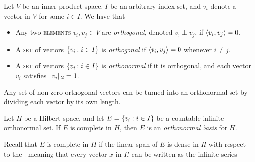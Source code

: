 \documentclass[../thesis.tex]{subfiles}
\begin{document}
\begin{definition}
    Let $V$ be an inner product space, $I$ be an arbitrary index set, and $v_i$ denote a vector in $V$ for some $i\in I$. We have that
    \begin{itemize}%
        \item Any two \textsc{elements} $v_i, v_j \in V$ are \emph{orthogonal}, denoted $v_i \perp v_j$, if $\langle v_i,v_j\rangle = 0$.
        \item A \textsc{set} of vectors $\{v_i : i \in I\}$ is \emph{orthogonal} if $\langle v_i,v_j\rangle = 0$ whenever $i\neq j$. %
        \item A \textsc{set} of vectors $\{v_i : i \in I\}$ is \emph{orthonormal} if it is orthogonal, and each vector $v_i$ satisfies $\|v_i\|_2 = 1$. %
        \qedhere
    \end{itemize}
\end{definition}
\begin{remark}
    Any set of non-zero orthogonal vectors can be turned into an orthonormal set by dividing each vector by its own length.
\end{remark}
\begin{definition}
    Let $H$ be a Hilbert space, and let $E = \{v_i : i \in I\}$ be a countable infinite orthonormal set. If $E$ is complete in $H$, then $E$ is an \emph{orthonormal basis} for $H$.
\end{definition}
Recall that $E$ is complete in $H$ if the linear span of $E$ is dense in $H$ with respect to the \GenNormH, meaning that every vector $x$ in $H$ can be written as the infinite series
\end{document}
